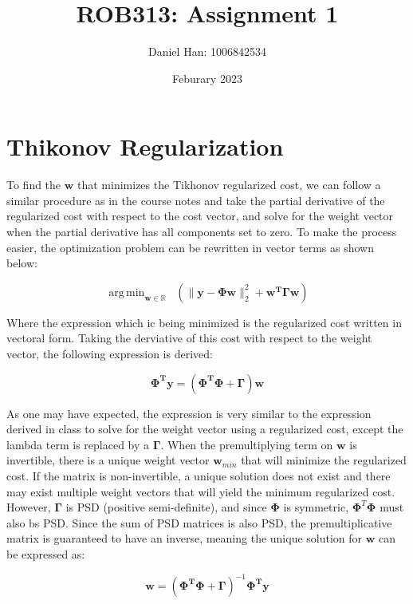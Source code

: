 \documentclass{article}
\title{ROB313: Assignment 1}
\author{Daniel Han: 1006842534}
\date{Feburary 2023}
\DeclareMathOperator*{\argmin}{arg\,min}
\begin{document}
\maketitle


\section{Thikonov Regularization}
To find the $\textbf{w}$ that minimizes the Tikhonov regularized cost, we can follow a similar procedure as in the course notes and take the partial derivative of the regularized cost with respect to the cost vector, and solve for the weight vector when the partial derivative has all components set to zero. To make the process easier, the optimization problem can be rewritten in vector terms as shown below:

\begin{equation}
\argmin_{\textbf{w} \in \mathbb{R}} \;\;  (\| \textbf{y} - \mathbf{\Phi}\mathbf{w} \|_2^2 + \mathbf{w^T}\mathbf{\Gamma}\mathbf{w})
\end{equation}

Where the expression which ic being minimized is the regularized cost written in vectoral form. Taking the derviative of this cost with respect to the weight vector, the following expression is derived:

\begin{equation}
\mathbf{\Phi^T}\mathbf{y} = (\mathbf{\Phi^T \Phi} + \mathbf{\Gamma})\mathbf{w}
\end{equation}

As one may have expected, the expression is very similar to the expression derived in class to solve for the weight vector using a regularized cost, except the lambda term is replaced by a $\mathbf{\Gamma}$. When the premultiplying term on $\mathbf{w}$ is invertible, there is a unique weight vector $\mathbf{w}_{min}$ that will minimize the regularized cost. If the matrix is non-invertible, a unique solution does not exist and there may exist multiple weight vectors that will yield the minimum regularized cost. However, $\boldsymbol\Gamma$ is PSD (positive semi-definite), and since $\boldsymbol\Phi$ is symmetric, $\boldsymbol\Phi^T \boldsymbol\Phi$ must also bs PSD. Since the sum of PSD matrices is also PSD, the premultiplicative matrix is guaranteed to have an inverse, meaning the unique solution for $\mathbf{w}$ can be expressed as:

\begin{equation}
\mathbf{w} = (\mathbf{\Phi^T \Phi} + \mathbf{\Gamma})^{-1}\mathbf{\Phi^T}\mathbf{y}
\end{equation}
\end{document}
